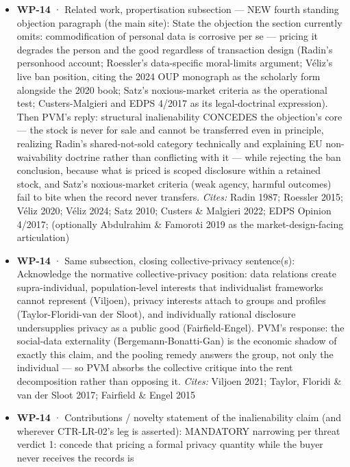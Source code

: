 \documentclass[
  11pt,
]{article}
\providecommand{\tightlist}{%
  \setlength{\itemsep}{0pt}\setlength{\parskip}{0pt}}
\begin{document}
\begin{itemize}
\tightlist
\item
  \textbf{WP-14} · Related work, propertisation subsection --- NEW
  fourth standing objection paragraph (the main site): State the
  objection the section currently omits: commodification of personal
  data is corrosive per se --- pricing it degrades the person and the
  good regardless of transaction design (Radin's personhood account;
  Roessler's data-specific moral-limits argument; Véliz's live ban
  position, citing the 2024 OUP monograph as the scholarly form
  alongside the 2020 book; Satz's noxious-market criteria as the
  operational test; Custers-Malgieri and EDPS 4/2017 as its
  legal-doctrinal expression). Then PVM's reply: structural
  inalienability CONCEDES the objection's core --- the stock is never
  for sale and cannot be transferred even in principle, realizing
  Radin's shared-not-sold category technically and explaining EU
  non-waivability doctrine rather than conflicting with it --- while
  rejecting the ban conclusion, because what is priced is scoped
  disclosure within a retained stock, and Satz's noxious-market criteria
  (weak agency, harmful outcomes) fail to bite when the record never
  transfers. \emph{Cites:} Radin 1987; Roessler 2015; Véliz 2020; Véliz
  2024; Satz 2010; Custers \& Malgieri 2022; EDPS Opinion 4/2017;
  (optionally Abdulrahim \& Famoroti 2019 as the market-design-facing
  articulation)
\item
  \textbf{WP-14} · Same subsection, closing collective-privacy
  sentence(s): Acknowledge the normative collective-privacy position:
  data relations create supra-individual, population-level interests
  that individualist frameworks cannot represent (Viljoen), privacy
  interests attach to groups and profiles (Taylor-Floridi-van der
  Sloot), and individually rational disclosure undersupplies privacy as
  a public good (Fairfield-Engel). PVM's response: the social-data
  externality (Bergemann-Bonatti-Gan) is the economic shadow of exactly
  this claim, and the pooling remedy answers the group, not only the
  individual --- so PVM absorbs the collective critique into the rent
  decomposition rather than opposing it. \emph{Cites:} Viljoen 2021;
  Taylor, Floridi \& van der Sloot 2017; Fairfield \& Engel 2015
\item
  \textbf{WP-14} · Contributions / novelty statement of the
  inalienability claim (and wherever CTR-LR-02's leg is asserted):
  MANDATORY narrowing per threat verdict 1: concede that pricing a
  formal privacy quantity while the buyer never receives the records is

\end{itemize}
\end{document}
